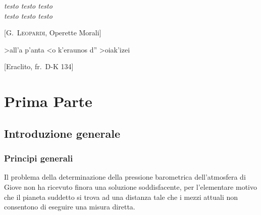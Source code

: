 \documentclass[%
corpo=11pt,
twoside,
 stile=classica,
oldstyle,
greek,%
]{toptesi}
\begin{document}
\tablespagetrue\figurespagetrue %
\indici

\ifclassica   
\begin{citazioni}
        \textit{testo testo testo\\testo testo testo}

        [\textsc{G.\ Leopardi}, Operette Morali]

        \textgreek{>all'a p'anta <o k'eraunos d'' >oiak'izei}

        [Eraclito, fr.\ D-K 134]
    \end{citazioni}

\fi


\mainmatter

\part{Prima Parte}%
\chapter{Introduzione generale}

\section{Principi generali}
Il problema della determinazione della pressione barometrica dell'atmosfera di
Giove non ha ricevuto finora una soluzione soddisfacente, per l'elementare
motivo che il pianeta suddetto si trova ad una distanza tale che i mezzi attuali
non consentono di eseguire una misura diretta.
\end{document}
